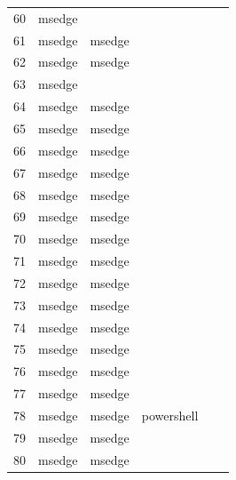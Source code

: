 \documentclass[a4paper,twoside,12pt]{book}
\begin{document}
\begin{appendices}
\begin{table}
\begin{tabular}{llllll}
		60  &  msedge &                &                &                &                \\
		61  &  msedge &         msedge &                &                &                \\
		62  &  msedge &         msedge &                &                &                \\
		63  &  msedge &                &                &                &                \\
		64  &  msedge &         msedge &                &                &                \\
		65  &  msedge &         msedge &                &                &                \\
		66  &  msedge &         msedge &                &                &                \\
		67  &  msedge &         msedge &                &                &                \\
		68  &  msedge &         msedge &                &                &                \\
		69  &  msedge &         msedge &                &                &                \\
		70  &  msedge &         msedge &                &                &                \\
		71  &  msedge &         msedge &                &                &                \\
		72  &  msedge &         msedge &                &                &                \\
		73  &  msedge &         msedge &                &                &                \\
		74  &  msedge &         msedge &                &                &                \\
		75  &  msedge &         msedge &                &                &                \\
		76  &  msedge &         msedge &                &                &                \\
		77  &  msedge &         msedge &                &                &                \\
		78  &  msedge &         msedge &     powershell &                &                \\
		79  &  msedge &         msedge &                &                &                \\
		80  &  msedge &         msedge &                &                &                \\

\end{tabular}
\end{table}
\end{appendices}
\end{document}
